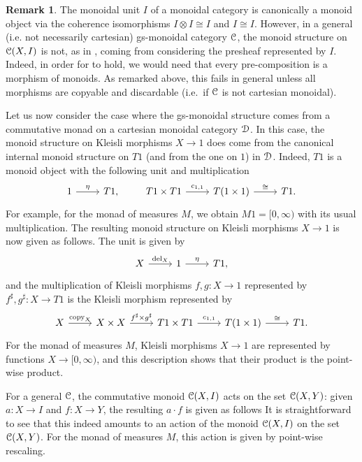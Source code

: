 \documentclass[a4paper,UKenglish,numberwithinsect,cleveref, autoref, thm-restate]{lipics-v2021}
\theoremstyle{plain} %
\theoremstyle{definition} %
\newtheorem{myremark}[mytheorem]{Remark}
\begin{document}
\begin{myremark}
 The monoidal unit $I$ of a monoidal category is canonically a monoid object via the coherence isomorphisms $I\otimes I\cong I$ and $I\cong I$. 
 However, in a general (i.e. not necessarily cartesian) gs-monoidal category $\mathcal{C}$, the monoid structure on $\mathcal{C}(X,I)$ is not, as in , coming from considering the presheaf represented by $I$. Indeed, in order for  to hold, we would need that every pre-composition is a morphism of monoids. As remarked above, this fails in general unless all morphisms are copyable and discardable (i.e.~if $\mathcal{C}$ is not cartesian monoidal).
\end{myremark}
%
%
Let us now consider the case where the gs-monoidal structure comes from a commutative monad on a cartesian monoidal category $\mathcal{D}$. 
In this case, the monoid structure on Kleisli morphisms $X\to 1$ does come from the canonical internal monoid structure on $T1$ (and from the one on $1$) in $\mathcal{D}$.
Indeed, $T1$ is a monoid object with the following unit and multiplication~\cite[Section~10]{kock2012distributions}
 \[
 \begin{tikzcd}
  1 \ar{r}{\eta} & T1 ,
 \end{tikzcd}
 \qquad
 \begin{tikzcd}
  T1 \times T1 \ar{r}{c_{1,1}} & T(1\times 1) \ar{r}{\cong} & T1 .
 \end{tikzcd}
 \]
 For example, for the monad of measures $M$, we obtain $M1=[0,\infty)$ with its usual multiplication.
 The resulting monoid structure on Kleisli morphisms $X\to 1$ is now given as follows. The unit is given by
 \[
 \begin{tikzcd}
  X \ar{r}{\mathrm{del}_X} & 1 \ar{r}{\eta} & T1 ,
 \end{tikzcd}
 \]
 and the multiplication of Kleisli morphisms $f, g : X \to 1$ represented by $f^\sharp,g^\sharp:X\to T1$ is the Kleisli morphism represented by
 \[
 \begin{tikzcd}
  X \ar{r}{\mathrm{copy}_X} & X\times X \ar{r}{f^\sharp\times g^\sharp} &
  T1 \times T1 \ar{r}{c_{1,1}} & T(1\times 1) \ar{r}{\cong} & T1 .
 \end{tikzcd}
 \]
 For the monad of measures $M$, Kleisli morphisms $X\to 1$ are represented by functions $X\to [0,\infty)$, and this description shows that their product is the point-wise product.

For a general $\mathcal{C}$, the commutative monoid $\mathcal{C}(X,I)$ acts on the set $\mathcal{C}(X,Y)$: given $a:X\to I$ and $f:X\to Y$, the resulting $a\cdot f$ is given as follows
It is straightforward to see that this indeed amounts to an action of the monoid $\mathcal{C}(X,I)$ on the set $\mathcal{C}(X,Y)$.
For the monad of measures $M$, this action is given by point-wise rescaling.
\end{document}
